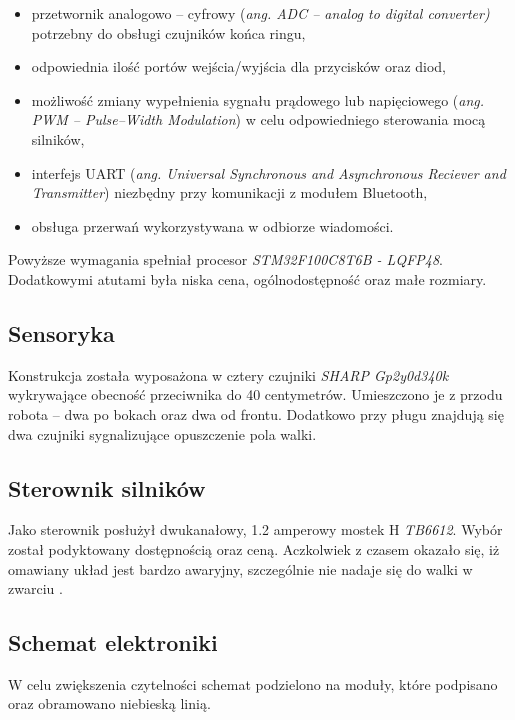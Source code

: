 \begin{itemize}
\item przetwornik analogowo – cyfrowy (\textit{ang. ADC – analog to digital converter)} potrzebny do obsługi czujników końca ringu,
\item odpowiednia ilość portów wejścia/wyjścia dla przycisków oraz diod,
\item możliwość zmiany wypełnienia sygnału prądowego lub napięciowego (\textit{ang. PWM – Pulse–Width Modulation}) w celu odpowiedniego sterowania mocą silników,
\item interfejs UART (\textit{ang. Universal Synchronous and Asynchronous Reciever and Transmitter}) niezbędny przy komunikacji z modułem Bluetooth,
\item obsługa przerwań wykorzystywana w odbiorze wiadomości.
\end{itemize}

Powyższe wymagania spełniał procesor \textit{STM32F100C8T6B - LQFP48}. Dodatkowymi atutami była niska cena, ogólnodostępność oraz małe rozmiary.

\subsection{Sensoryka}
Konstrukcja została wyposażona w cztery czujniki \textit{SHARP Gp2y0d340k} wykrywające obecność przeciwnika do 40 centymetrów. Umieszczono je z przodu robota – dwa po bokach oraz dwa od frontu. Dodatkowo przy pługu znajdują się dwa czujniki sygnalizujące opuszczenie pola walki.

\subsection{Sterownik silników}
Jako sterownik posłużył dwukanałowy, 1.2 amperowy mostek H \textit{TB6612}. Wybór został podyktowany dostępnością oraz ceną. Aczkolwiek z czasem okazało się, iż omawiany układ jest bardzo awaryjny, szczególnie nie nadaje się do walki w zwarciu \cite{AVR}.

\subsection{Schemat elektroniki}
W celu zwiększenia czytelności schemat podzielono na moduły, które podpisano oraz obramowano niebieską linią. 

